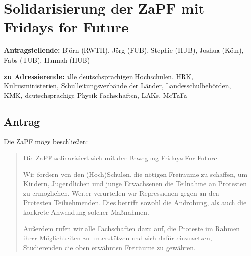 \documentclass[draft,10pt,oneside]{scrartcl}
\begin{document}
\section*{Solidarisierung der ZaPF mit Fridays for Future}

\textbf{Antragstellende:} Björn (RWTH), Jörg (FUB), Stephie (HUB), Joshua
(Köln), Fabs (TUB), Hannah (HUB)

\textbf{zu Adressierende:} alle deutschsprachigen Hochschulen, HRK,
Kultusministerien, Schulleitungsverbände der Länder, Landesschulbehörden, KMK,
deutschsprachige Physik-Fachschaften, LAKs, MeTaFa

\subsection*{Antrag}

Die ZaPF möge beschließen:

\begin{quote}
    Die ZaPF solidarisiert sich mit der Bewegung \glqq{}Fridays For
    Future\grqq{}.

    Wir fordern von den (Hoch)Schulen, die nötigen Freiräume zu schaffen, um
    Kindern, Jugendlichen und junge Erwachsenen die Teilnahme an Protesten zu
    ermöglichen.  Weiter verurteilen wir Repressionen gegen an den Protesten
    Teilnehmenden. Dies betrifft sowohl die Androhung, als auch die konkrete
    Anwendung solcher Maßnahmen.

    Außerdem rufen wir alle Fachschaften dazu auf, die Proteste im Rahmen ihrer
    Möglichkeiten zu unterstützen und sich dafür einzusetzen, Studierenden die
    oben erwähnten Freiräume zu gewähren.
\end{quote}
\end{document}
